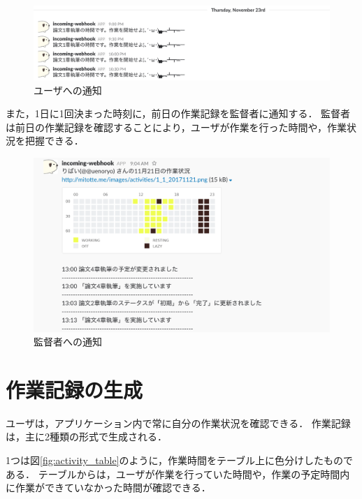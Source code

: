 \begin{figure}[h]
  \begin{center}
  \includegraphics[width=14.0cm]{graphics/notification01.png}
  \caption{ユーザへの通知}
  \end{center}
\end{figure}

また，1日に1回決まった時刻に，前日の作業記録を監督者に通知する．
監督者は前日の作業記録を確認することにより，ユーザが作業を行った時間や，作業状況を把握できる．

\begin{figure}[h]
  \begin{center}
  \includegraphics[width=14.0cm]{graphics/notification02.png}
  \caption{監督者への通知}
  \end{center}
\end{figure}

\clearpage

\section{作業記録の生成}
ユーザは，アプリケーション内で常に自分の作業状況を確認できる．
作業記録は，主に2種類の形式で生成される．

1つは図\ref{fig:activity_table}のように，作業時間をテーブル上に色分けしたものである．
テーブルからは，ユーザが作業を行っていた時間や，作業の予定時間内に作業ができていなかった時間が確認できる．

